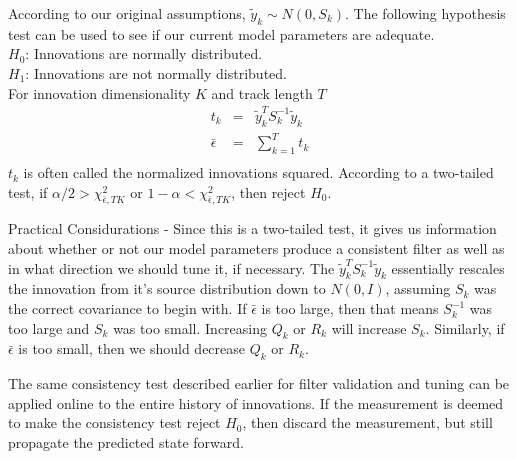\medskip
{} According to our original assumptions, $\tilde{y}_k \sim N(0, S_k)$.  The following hypothesis test can be used to see if our current model parameters are adequate.\\
$H_0$: Innovations are normally distributed.\\
$H_1$: Innovations are not normally distributed.\\
For innovation dimensionality $K$ and track length $T$
\begin{eqnarray*}
t_k &=& \tilde{y}_k^T S^{-1}_k \tilde{y}_k\\
\bar{\epsilon} &=& \sum_{k=1}^T t_k\\
\end{eqnarray*}
$t_k$ is often called the normalized innovations squared.  According to a two-tailed test, if $\alpha/2 > \chi^2_{\bar{\epsilon}, TK}$ or $1-\alpha < \chi^2_{\bar{\epsilon}, TK}$, then reject $H_0$.

\medskip
\noindent Practical Considurations - Since this is a two-tailed test, it gives us information about whether or not our model parameters produce a consistent filter as well as in what direction we should tune it, if necessary.  The $\tilde{y}_k^T S^{-1}_k \tilde{y}_k$ essentially rescales the innovation from it's source distribution down to $N(0,I)$, assuming $S_k$ was the correct covariance to begin with.  If $\bar{\epsilon}$ is too large, then that means $S^{-1}_k$ was too large and $S_k$ was too small.  Increasing $Q_k$ or $R_k$ will increase $S_k$.  Similarly, if $\bar{\epsilon}$ is too small, then we should decrease $Q_k$ or $R_k$.

\medskip
{} The same consistency test described earlier for filter validation and tuning can be applied online to the entire history of innovations.  If the measurement is deemed to make the consistency test reject $H_0$, then discard the measurement, but still propagate the predicted state forward.

